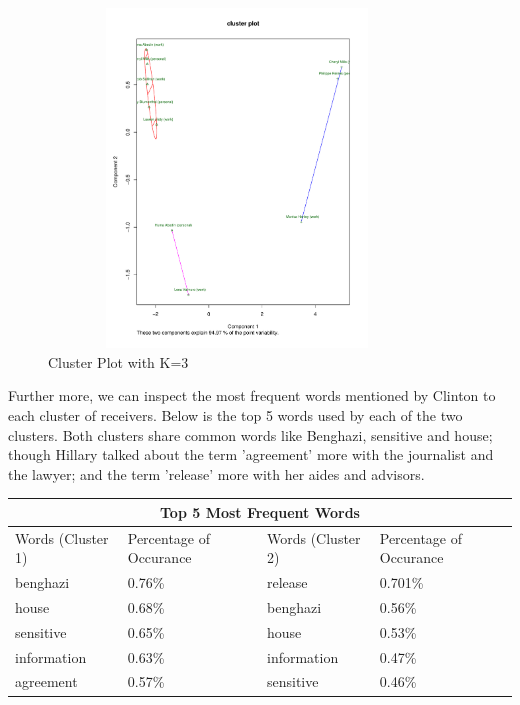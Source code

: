 \begin{figure}[h!]
    \centering
    \includegraphics[width=10cm,height=9cm]
    {c3.pdf}
    \caption{Cluster Plot with K=3}
\end{figure}

\newpage
Further more, we can inspect the most frequent words mentioned by Clinton to each cluster of receivers. Below is the top 5 words used by each of the two clusters. Both clusters share common words like Benghazi, sensitive and house; though Hillary talked about the term 'agreement' more with the journalist and the lawyer; and the term 'release' more with her aides and advisors. 
\\

\begin{center}
\begin{tabular}{ |p{3cm}|p{3cm}|| p{3cm}|p{3cm}|  }
 \hline
 \multicolumn{4}{|c|}{Top 5 Most Frequent Words} \\
 \hline
 Words (Cluster 1)  & Percentage of Occurance & Words (Cluster 2) & Percentage of Occurance\\
 \hline
 benghazi & 0.76\% & release  & 0.701\% \\
 house &  0.68\% & benghazi & 0.56\% \\
 sensitive & 0.65\% & house & 0.53\%\\
 information & 0.63\% & information & 0.47\%\\
 agreement & 0.57\% &  sensitive  & 0.46\% \\
 \hline
\end{tabular}
\end{center}
